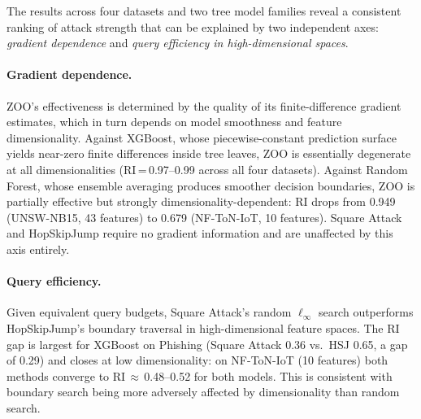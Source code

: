 \documentclass[runningheads]{llncs}
\begin{document}
The results across four datasets and two tree model families reveal a consistent
ranking of attack strength that can be explained by two independent axes:
\emph{gradient dependence} and \emph{query efficiency in high-dimensional spaces}.

\paragraph{Gradient dependence.}
ZOO's effectiveness is determined by the quality of its finite-difference
gradient estimates, which in turn depends on model smoothness and feature
dimensionality.  Against XGBoost, whose piecewise-constant prediction surface
yields near-zero finite differences inside tree leaves, ZOO is essentially
degenerate at all dimensionalities (RI\,=\,0.97--0.99 across all four datasets).
Against Random Forest, whose ensemble averaging produces smoother decision
boundaries, ZOO is partially effective but strongly dimensionality-dependent:
RI drops from 0.949 (UNSW-NB15, 43 features) to 0.679 (NF-ToN-IoT, 10 features).
Square Attack and HopSkipJump require no gradient information and are unaffected
by this axis entirely.

\paragraph{Query efficiency.}
Given equivalent query budgets, Square Attack's random $\ell_\infty$ search
outperforms HopSkipJump's boundary traversal in high-dimen\-sional feature spaces.
The RI gap is largest for XGBoost on Phishing (Square Attack 0.36 vs.\ HSJ 0.65,
a gap of 0.29) and closes at low dimensionality: on NF-ToN-IoT (10 features)
both methods converge to RI\,$\approx$\,0.48--0.52 for both models.  This is
consistent with boundary search being more adversely affected by dimensionality
than random search.
\end{document}
